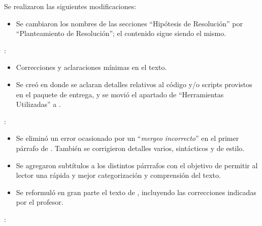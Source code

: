 \documentclass[11pt, a4paper, twoside]{article}
\begin{document}
{}

Se realizaron las siguientes modificaciones:

\begin{itemize}
\item Se cambiaron los nombres de las secciones ``Hipótesis de Resolución''
por ``Planteamiento de Resolución''; el contenido sigue siendo el mismo.
\end{itemize}

:
\begin{itemize}[leftmargin=+4em]
  \item Correcciones y aclaraciones mínimas en el texto.
    
    \item Se creó 
    en donde se aclaran detalles relativos al código 
    y/o scripts provistos en el paquete de entrega, 
    y se movió el apartado de ``Herramientas Utilizadas'' 
    a .
\end{itemize}

:
\begin{itemize}[leftmargin=+4em]

    \item Se eliminó un error ocasionado por un ``\textit{mergeo incorrecto}'' 
    en el primer párrafo de .
    También se corrigieron detalles varios, sintácticos y de estilo.
    
    \item Se agregaron subtítulos a los distintos párrrafos con el
    objetivo de permitir al lector una rápida y mejor
    categorización y comprensión del texto.
    
    \item Se reformuló en gran parte el texto de ,
    incluyendo las correcciones indicadas por el profesor.
    
\end{itemize}

:
\end{document}
